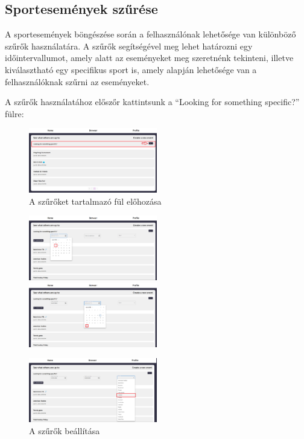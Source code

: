 \subsection{Sportesemények szűrése}

A sportesemények böngészése során a felhasználónak lehetősége van különböző szűrők használatára.
A szűrők segítségével meg lehet határozni egy időintervallumot, amely alatt az eseményeket meg szeretnénk tekinteni, illetve kiválasztható egy
specifikus sport is, amely alapján lehetősége van a felhasználóknak szűrni az eseményeket.

A szűrők használatához előszőr kattintsunk a ``Looking for something specific?'' fülre:

\begin{figure}[h]
	\centering
	\includegraphics[width=0.5\textwidth]{images/filtering_events_1.png}
	\caption{A szűrőket tartalmazó fül előhozása}
	\label{fig:filter_1}
\end{figure}

\newpage

\begin{figure}[ht]
	\includegraphics[width=0.5\textwidth]{images/filtering_events_2.png}
	\includegraphics[width=0.5\textwidth]{images/filtering_events_3.png}
	\begin{center}
		\includegraphics[width=0.5\textwidth]{images/filtering_events_4.png}
	\end{center}
	\caption{A szűrők beállítása}	
	\label{fig:applying_filters}
\end{figure}

